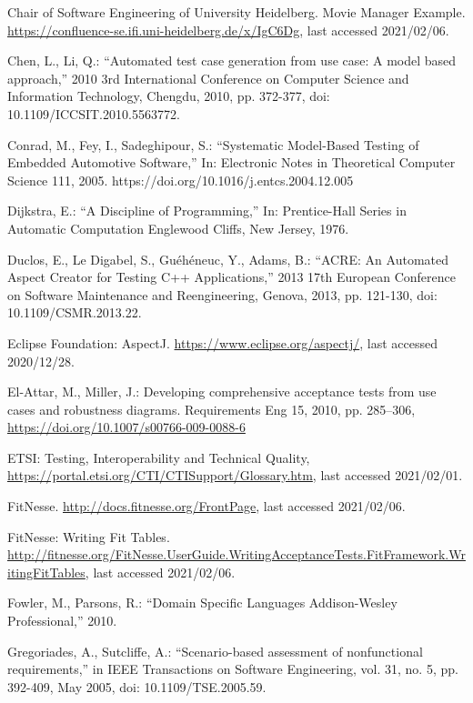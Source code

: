 \documentclass[a4paper,10pt, bibliography=totocnumbered]{scrreprt}
\begin{document}
\begin{thebibliography}{9}
 Chair of Software Engineering of University Heidelberg. Movie Manager Example. 
\url{https://confluence-se.ifi.uni-heidelberg.de/x/IgC6Dg}, last accessed 2021/02/06. 

 Chen, L., Li, Q.: \enquote{Automated test case generation from use case: A model based approach,} 2010 3rd International Conference on Computer Science and Information Technology, Chengdu, 2010, pp. 372-377, doi: 10.1109/ICCSIT.2010.5563772.

 Conrad, M., Fey, I., Sadeghipour, S.: \enquote{Systematic Model-Based Testing of Embedded Automotive Software,} 
In: Electronic Notes in Theoretical Computer Science 111, 2005.
https://doi.org/10.1016/j.entcs.2004.12.005

 Dijkstra, E.: \enquote{A Discipline of Programming,}
In: Prentice-Hall Series in Automatic Computation Englewood Cliffs, New Jersey, 1976.

 Duclos, E., Le Digabel, S., Guéhéneuc, Y.,  Adams, B.: \enquote{ACRE: An Automated Aspect Creator for Testing C++ Applications,} 2013 17th European Conference on Software Maintenance and Reengineering, Genova, 2013, pp. 121-130, doi: 10.1109/CSMR.2013.22.

 Eclipse Foundation: AspectJ.
\url{https://www.eclipse.org/aspectj/},  last accessed 2020/12/28.

 El-Attar, M., Miller, J.: Developing comprehensive acceptance tests from use cases and robustness diagrams. Requirements Eng 15, 2010, pp. 285–306, \url{https://doi.org/10.1007/s00766-009-0088-6}

 ETSI: Testing, Interoperability and Technical Quality, \url{https://portal.etsi.org/CTI/CTISupport/Glossary.htm}, last accessed 2021/02/01.

 FitNesse. \url{http://docs.fitnesse.org/FrontPage}, last accessed 2021/02/06.

 FitNesse: Writing Fit Tables. \url{http://fitnesse.org/FitNesse.UserGuide.WritingAcceptanceTests.FitFramework.WritingFitTables}, last accessed 2021/02/06.

 Fowler, M., Parsons, R.: \enquote{Domain Specific Languages
Addison-Wesley Professional,} 2010.

 Gregoriades, A., Sutcliffe, A.: \enquote{Scenario-based assessment of nonfunctional requirements,} in IEEE Transactions on Software Engineering, vol. 31, no. 5, pp. 392-409, May 2005, doi: 10.1109/TSE.2005.59.


\end{thebibliography}
\end{document}
